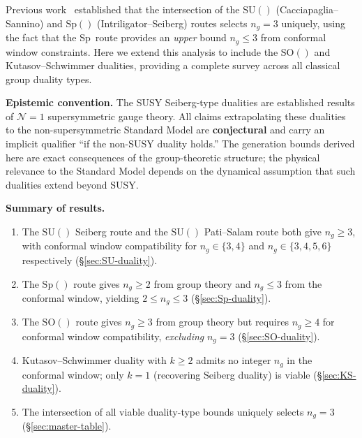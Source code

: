 \documentclass[11pt,a4paper]{article}
\theoremstyle{plain}
\theoremstyle{definition}
\theoremstyle{remark}
\newcommand{\ngen}{n_g}
\newcommand{\SU}[1]{\mathrm{SU}(#1)}
\newcommand{\SO}[1]{\mathrm{SO}(#1)}
\newcommand{\Sp}[1]{\mathrm{Sp}(#1)}
\begin{document}
Previous work~\cite{Paper1} established that the intersection of the
$\SU{}$ (Cacciapaglia--Sannino) and $\Sp{}$ (Intriligator--Seiberg)
routes selects $\ngen = 3$ uniquely, using the fact that the Sp~route
provides an \emph{upper} bound $\ngen \leq 3$ from conformal window
constraints.  Here we extend this analysis to include the $\SO{}$ and
Kutasov--Schwimmer dualities, providing a complete survey across all
classical group duality types.

\medskip

\textbf{Epistemic convention.}  The SUSY Seiberg-type dualities are
established results of $\mathcal{N}=1$ supersymmetric gauge theory.  All
claims extrapolating these dualities to the non-supersymmetric Standard
Model are \textbf{conjectural} and carry an implicit qualifier ``if the
non-SUSY duality holds.''  The generation bounds derived here are exact
consequences of the group-theoretic structure; the physical relevance
to the Standard Model depends on the dynamical assumption that such
dualities extend beyond SUSY.

\medskip

\textbf{Summary of results.}
\begin{enumerate}
  \item The $\SU{}$ Seiberg route and the $\SU{}$ Pati--Salam route both
    give $\ngen \geq 3$, with conformal window compatibility for
    $\ngen \in \{3, 4\}$ and $\ngen \in \{3, 4, 5, 6\}$ respectively
    (\S\ref{sec:SU-duality}).
  \item The $\Sp{}$ route gives $\ngen \geq 2$ from group theory and
    $\ngen \leq 3$ from the conformal window, yielding
    $2 \leq \ngen \leq 3$
    (\S\ref{sec:Sp-duality}).
  \item The $\SO{}$ route gives $\ngen \geq 3$ from group theory but
    requires $\ngen \geq 4$ for conformal window compatibility,
    \emph{excluding} $\ngen = 3$
    (\S\ref{sec:SO-duality}).
  \item Kutasov--Schwimmer duality with $k \geq 2$ admits no integer
    $\ngen$ in the conformal window; only $k = 1$ (recovering Seiberg
    duality) is viable (\S\ref{sec:KS-duality}).
  \item The intersection of all viable duality-type bounds uniquely
    selects $\ngen = 3$ (\S\ref{sec:master-table}).
\end{enumerate}


\end{document}
